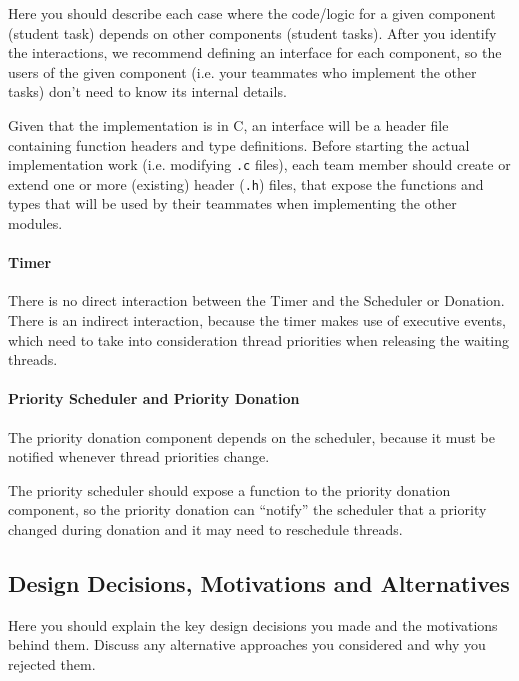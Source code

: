 Here you should describe each case where the code/logic for a given component (student task) depends on other components (student tasks).
After you identify the interactions, we recommend defining an interface for each component, so the users
of the given component (i.e. your teammates who implement the other tasks) don't need to know its internal details.

Given that the implementation is in C, an interface will be a header file containing function headers and type definitions.
Before starting the actual implementation work (i.e. modifying \texttt{.c} files), each team member should create or extend one
or more (existing) header (\texttt{.h}) files, that expose the functions and types that will be used by their teammates
when implementing the other modules.

\begin{tcolorbox}[title={Example}]
\paragraph{Timer} There is no direct interaction between the Timer and the Scheduler or Donation. There is an indirect interaction,
because the timer makes use of executive events, which need to take into consideration thread priorities when releasing the waiting threads.

\paragraph{Priority Scheduler and Priority Donation}
The priority donation component depends on the scheduler, because it must be notified whenever thread priorities change.

The priority scheduler should expose a function to the priority donation component, so the priority donation
can ``notify'' the scheduler that a priority changed during donation and it may need to reschedule threads.
\end{tcolorbox}


\subsection{Design Decisions, Motivations and Alternatives}

Here you should explain the key design decisions you made and the motivations behind them.
Discuss any alternative approaches you considered and why you rejected them.

